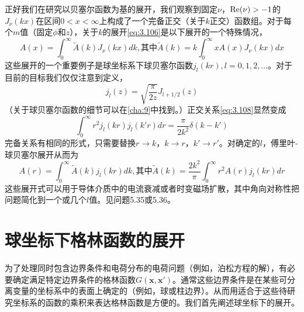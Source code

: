 \documentclass[12pt]{book}
\numberwithin{equation}{chapter}
\numberwithin{figure}{chapter}
\numberwithin{footnote}{page}
\begin{document}
正好我们在研究以贝塞尔函数为基的展开，我们观察到固定$\nu$，${\rm Re}(\nu)>-1$的$J_{\nu}(kx)$在区间$0<x<\infty$上构成了一个完备正交（关于$k$正交）函数组。对于每个$m$值（固定$\phi$和$z$），关于$k$的展开\autoref{eq:3.106}是以下展开的一个特殊情况，
\begin{equation}\label{eq:3.110}
    A(x)=\int_0^\infty \widetilde{A}(k)J_\nu(kx)dk,\mbox{其中}\widetilde{A}(k)=k\int_0^\infty xA(x)J_\nu(kx)dx
\end{equation}
这些展开的一个重要例子是球坐标系下球贝塞尔函数$j_l(kr),l=0,1,2,\dots$。对于目前的目标我们仅仅注意到定义，
\begin{equation}\label{eq:3.111}
    j_l(z)=\sqrt{\frac{\pi}{2z}}J_{l+1/2}(z)
\end{equation}
（关于球贝塞尔函数的细节可以在\autoref{cha:9}中找到。）正交关系\autoref{eq:3.108}显然变成
\begin{equation}\label{eq:3.112}
    \int_0^\infty r^2 j_l(kr)j_l(k'r)dr=\frac{\pi}{2k^2}\delta(k-k')
\end{equation}
完备关系有相同的形式，只需要替换$r\to k$，$k\to r$，$k'\to r'$。对确定的$l$，傅里叶-球贝塞尔展开从而为
\begin{equation}\label{eq:3.113}
    A(r)=\int_0^\infty \widetilde{A}(k)j_l(kr)dk,\mbox{其中}\widetilde{A}(k)=\frac{2k^2}{\pi}\int_0^\infty r^2 A(r)j_l(kr)dr
\end{equation}
这些展开式可以用于导体介质中的电流衰减或者时变磁场扩散，其中角向对称性把问题简化到一个或几个$l$值。见问题5.35或5.36。

\section{球坐标下格林函数的展开}\label{sec:3.9}

为了处理同时包含边界条件和电荷分布的电荷问题（例如，泊松方程的解），有必要确定满足特定边界条件的格林函数$G(\mathbf{x},\mathbf{x}')$。通常这些边界条件是在某些可分离变量的坐标系中的表面上确定的（例如，球或柱边界）。从而用适合于这些待研究坐标系的函数的乘积来表达格林函数是方便的。我们首先阐述球坐标下的展开。
\end{document}
